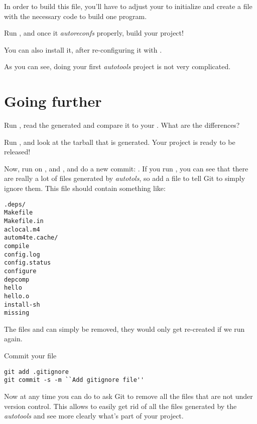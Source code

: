 In order to build this file, you'll have to adjust your
 to initialize  and create a
 file with the necessary code to build one program.

Run , and once it {\em autoreconfs} properly,
build your project!

You can also install it, after re-configuring it with
.

As you can see, doing your first {\em autotools} project is not very
complicated.

\section{Going further}

Run , read the generated  and
compare it to your . What are the differences?

Run , and look at the tarball that is generated. Your
project is ready to be released!

Now, run  on ,  and
, and do a new commit: . If you run , you can see that
there are really a lot of files generated by {\em autotols}, so add a
 file to tell Git to simply ignore them. This file
should contain something like:

\begin{verbatim}
.deps/
Makefile
Makefile.in
aclocal.m4
autom4te.cache/
compile
config.log
config.status
configure
depcomp
hello
hello.o
install-sh
missing
\end{verbatim}

The files  and  can simply be
removed, they would only get re-created if we run 
again.

Commit your  file

\begin{verbatim}
git add .gitignore
git commit -s -m ``Add gitignore file''
\end{verbatim}

Now at any time you can do  to ask Git to remove
all the files that are not under version control. This allows to
easily get rid of all the files generated by the {\em autotools} and
see more clearly what's part of your project.

